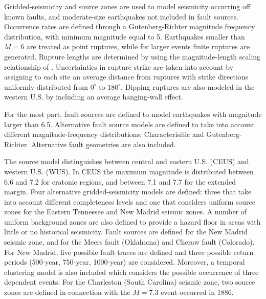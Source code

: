 Gridded-seismicity and source zones are used to model seismicity occurring off known faults, and moderate-size earthquakes not included in fault sources. Occurrence rates are defined through a Gutenberg-Richter magnitude frequency distribution, with minimum magnitude equal to 5. Earthquakes smaller than $M=6$ are treated as point ruptures, while for larger events finite ruptures are generated. Rupture lengths are determined by using the magnitude-length scaling relationship of \citet{wells1994}. Uncertainties in rupture strike are taken into account by assigning to each site an average distance from ruptures with strike directions uniformly distributed from $0^{\circ}$ to $180^{\circ}$. Dipping ruptures are also modeled in the western U.S. by including an average hanging-wall effect.

For the most part, fault sources are defined to model earthquakes with magnitude larger than 6.5. Alternative fault source models are defined to take into account different magnitude-frequency distributions: Characterisitic \citep{schwartscoppersmith1984} and Gutenberg-Richter. Alternative fault geometries are also included.

The source model distinguishes between central and eastern U.S. (CEUS) and western U.S. (WUS). In CEUS the maximum magnitude is distributed between 6.6 and 7.2 for cratonic regions, and between 7.1 and 7.7 for the extended margin. Four alternative gridded-seismicity models are defined: three that take into account different completeness levels and one that considers uniform source zones for the Eastern Tennessee and New Madrid seismic zones. A number of uniform background zones are also defined to provide a hazard floor in areas with little or no historical seismicity. Fault sources are defined for the New Madrid seismic zone, and for the Meers fault (Oklahoma) and Cheraw fault (Colorado). For New Madrid, five possible fault traces are defined and three possible return periods (500-year, 750-year, 1000-year) are considered. Moreover, a temporal clustering model is also included which considers the possible occurrence of three dependent events. For the Charleston (South Carolina) seismic zone, two source zones are defined in connection with the $M=7.3$ event occurred in 1886.


